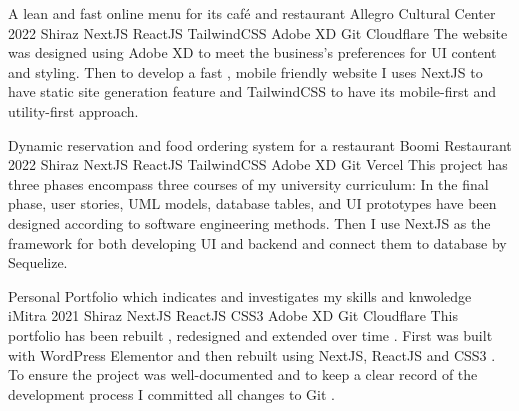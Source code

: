 

\begin{cventries}

\cventry
{A lean and fast online menu for its café and restaurant} %
{Allegro Cultural Center} %
{2022} %
{Shiraz} %
{
  NextJS \mitdiv ReactJS \mitdiv TailwindCSS \mitdiv Adobe XD \mitdiv Git \mitdiv Cloudflare
  \newline
  The website was designed using Adobe XD to meet the business's preferences for UI content and styling.
  Then to develop a fast , mobile friendly website I uses NextJS to have static site generation feature
  and TailwindCSS to have its mobile-first and utility-first approach.
}

\cventry
{Dynamic reservation and food ordering system for a restaurant} %
{Boomi Restaurant} %
{2022} %
{Shiraz} %
{
  NextJS \mitdiv ReactJS \mitdiv TailwindCSS \mitdiv Adobe XD \mitdiv Git \mitdiv Vercel
  \newline
  This project has three phases encompass three courses of my university curriculum:
  \newline
  In the final phase, user stories, UML models, database tables, and UI prototypes have been designed
  according to software engineering methods. Then I use NextJS as the framework for both developing UI
  and backend and connect them to database by Sequelize.
}

\cventry
{Personal Portfolio which indicates and investigates my skills and knwoledge} %
{iMitra} %
{2021} %
{Shiraz} %
{
  NextJS \mitdiv ReactJS \mitdiv CSS3 \mitdiv Adobe XD \mitdiv Git \mitdiv Cloudflare
  \newline
  This portfolio has been rebuilt , redesigned and extended over time .
  First was built with WordPress Elementor and then rebuilt using NextJS, ReactJS and CSS3 .
  To ensure the project was well-documented and to keep a clear record of the development process
  I committed all changes to Git .
}


\end{cventries}
